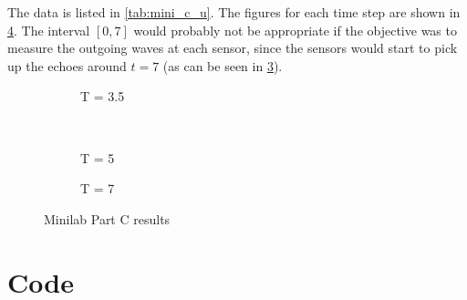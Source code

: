 \documentclass[12pt]{article}
\begin{document}
The data is listed in \cref{tab:mini_c_u}. The figures for each time
step are shown in \cref{fig:mini_c}. The interval $[0,7]$ would
probably not be appropriate if the objective was to measure the
outgoing waves at each sensor, since the sensors would start to pick
up the echoes around $t=7$ (as can be seen in \cref{fig:mini_c_7}).
\begin{figure}[H]
  \centering
  \begin{subfigure}{.5\textwidth}
    \caption{T = 3.5}
    \label{fig:mini_c_3_5}
  \end{subfigure}~
  \begin{subfigure}{.5\textwidth}
    \caption{T = 5}
    \label{fig:mini_c_5}
  \end{subfigure}
  \begin{subfigure}{\textwidth}
    \caption{T = 7}
    \label{fig:mini_c_7}
  \end{subfigure}
  \caption{Minilab Part C results}
  \label{fig:mini_c}
\end{figure}
\pagebreak
\section{Code}

\pagebreak

\pagebreak

\pagebreak

\pagebreak

\end{document}
